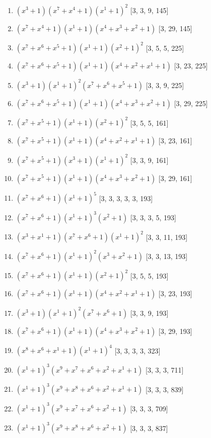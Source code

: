 \documentclass[10pt,twocolumn]{article}
\begin{document}
\begin{enumerate}
\item $(x^{3} + 1)(x^{7} + x^{4} + 1)(x^{1} + 1)^{2}$  [3, 3, 9, 145]
\item $(x^{7} + x^{4} + 1)(x^{1} + 1)(x^{4} + x^{3} + x^{2} + 1)$  [3, 29, 145]
\item $(x^{7} + x^{6} + x^{5} + 1)(x^{1} + 1)(x^{2} + 1)^{2}$  [3, 5, 5, 225]
\item $(x^{7} + x^{6} + x^{5} + 1)(x^{1} + 1)(x^{4} + x^{2} + x^{1} + 1)$  [3, 23, 225]
\item $(x^{3} + 1)(x^{1} + 1)^{2}(x^{7} + x^{6} + x^{5} + 1)$  [3, 3, 9, 225]
\item $(x^{7} + x^{6} + x^{5} + 1)(x^{1} + 1)(x^{4} + x^{3} + x^{2} + 1)$  [3, 29, 225]
\item $(x^{7} + x^{5} + 1)(x^{1} + 1)(x^{2} + 1)^{2}$  [3, 5, 5, 161]
\item $(x^{7} + x^{5} + 1)(x^{1} + 1)(x^{4} + x^{2} + x^{1} + 1)$  [3, 23, 161]
\item $(x^{7} + x^{5} + 1)(x^{3} + 1)(x^{1} + 1)^{2}$  [3, 3, 9, 161]
\item $(x^{7} + x^{5} + 1)(x^{1} + 1)(x^{4} + x^{3} + x^{2} + 1)$  [3, 29, 161]
\item $(x^{7} + x^{6} + 1)(x^{1} + 1)^{5}$  [3, 3, 3, 3, 3, 193]
\item $(x^{7} + x^{6} + 1)(x^{1} + 1)^{3}(x^{2} + 1)$  [3, 3, 3, 5, 193]
\item $(x^{3} + x^{1} + 1)(x^{7} + x^{6} + 1)(x^{1} + 1)^{2}$  [3, 3, 11, 193]
\item $(x^{7} + x^{6} + 1)(x^{1} + 1)^{2}(x^{3} + x^{2} + 1)$  [3, 3, 13, 193]
\item $(x^{7} + x^{6} + 1)(x^{1} + 1)(x^{2} + 1)^{2}$  [3, 5, 5, 193]
\item $(x^{7} + x^{6} + 1)(x^{1} + 1)(x^{4} + x^{2} + x^{1} + 1)$  [3, 23, 193]
\item $(x^{3} + 1)(x^{1} + 1)^{2}(x^{7} + x^{6} + 1)$  [3, 3, 9, 193]
\item $(x^{7} + x^{6} + 1)(x^{1} + 1)(x^{4} + x^{3} + x^{2} + 1)$  [3, 29, 193]
\item $(x^{8} + x^{6} + x^{1} + 1)(x^{1} + 1)^{4}$  [3, 3, 3, 3, 323]
\item $(x^{1} + 1)^{3}(x^{9} + x^{7} + x^{6} + x^{2} + x^{1} + 1)$  [3, 3, 3, 711]
\item $(x^{1} + 1)^{3}(x^{9} + x^{8} + x^{6} + x^{2} + x^{1} + 1)$  [3, 3, 3, 839]
\item $(x^{1} + 1)^{3}(x^{9} + x^{7} + x^{6} + x^{2} + 1)$  [3, 3, 3, 709]
\item $(x^{1} + 1)^{3}(x^{9} + x^{8} + x^{6} + x^{2} + 1)$  [3, 3, 3, 837]

\end{enumerate}
\end{document}
